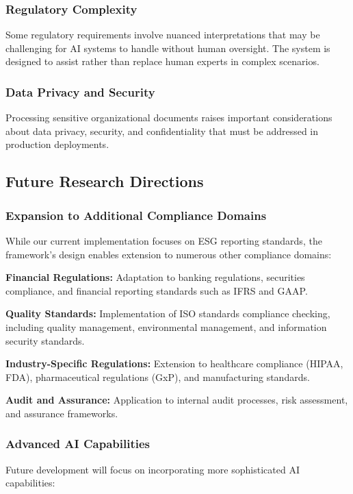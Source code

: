 \documentclass[conference]{IEEEtran}
\begin{document}
\subsubsection{Regulatory Complexity}
Some regulatory requirements involve nuanced interpretations that may be challenging for AI systems to handle without human oversight. The system is designed to assist rather than replace human experts in complex scenarios.

\subsubsection{Data Privacy and Security}
Processing sensitive organizational documents raises important considerations about data privacy, security, and confidentiality that must be addressed in production deployments.

\subsection{Future Research Directions}

\subsubsection{Expansion to Additional Compliance Domains}
While our current implementation focuses on ESG reporting standards, the framework's design enables extension to numerous other compliance domains:

\textbf{Financial Regulations:} Adaptation to banking regulations, securities compliance, and financial reporting standards such as IFRS and GAAP.

\textbf{Quality Standards:} Implementation of ISO standards compliance checking, including quality management, environmental management, and information security standards.

\textbf{Industry-Specific Regulations:} Extension to healthcare compliance (HIPAA, FDA), pharmaceutical regulations (GxP), and manufacturing standards.

\textbf{Audit and Assurance:} Application to internal audit processes, risk assessment, and assurance frameworks.

\subsubsection{Advanced AI Capabilities}
Future development will focus on incorporating more sophisticated AI capabilities:
\end{document}
